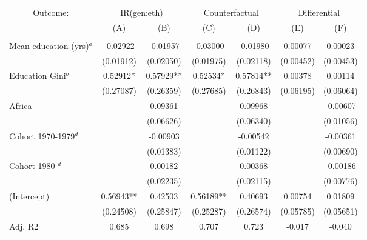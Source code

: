 
\begin{tabular}[t]{lcccccc}
\toprule
\multicolumn{1}{c}{Outcome:} & \multicolumn{2}{c}{IR(gen:eth)} & \multicolumn{2}{c}{Counterfactual} & \multicolumn{2}{c}{Differential} \\
\cmidrule(l{3pt}r{3pt}){1-1} \cmidrule(l{3pt}r{3pt}){2-3} \cmidrule(l{3pt}r{3pt}){4-5} \cmidrule(l{3pt}r{3pt}){6-7}
  & (A) & (B) & (C) & (D) & (E) & (F)\\
\midrule
\addlinespace[0.5em]
\multicolumn{7}{l}{\textit{Panel A: Education Variables}}\\
\midrule \hspace{1em}Mean education (yrs)$^a$ & -0.02922 & -0.01957 & -0.03000 & -0.01980 & 0.00077 & 0.00023\\
\hspace{1em} & (0.01912) & (0.02050) & (0.01975) & (0.02118) & (0.00452) & (0.00453)\\
\hspace{1em}Education Gini$^b$ & 0.52912* & 0.57929** & 0.52534* & 0.57814** & 0.00378 & 0.00114\\
\hspace{1em} & (0.27087) & (0.26359) & (0.27685) & (0.26843) & (0.06195) & (0.06064)\\
\hspace{1em}Africa &  & 0.09361 &  & 0.09968 &  & -0.00607\\
\hspace{1em} &  & (0.06626) &  & (0.06340) &  & (0.01056)\\
\hspace{1em}Cohort 1970-1979$^d$ &  & -0.00903 &  & -0.00542 &  & -0.00361\\
\hspace{1em} &  & (0.01383) &  & (0.01122) &  & (0.00690)\\
\hspace{1em}Cohort 1980-$^d$ &  & 0.00182 &  & 0.00368 &  & -0.00186\\
\hspace{1em} &  & (0.02235) &  & (0.02115) &  & (0.00776)\\
\hspace{1em}(Intercept) & 0.56943** & 0.42503 & 0.56189** & 0.40693 & 0.00754 & 0.01809\\
\hspace{1em} & (0.24508) & (0.25847) & (0.25287) & (0.26574) & (0.05785) & (0.05651)\\
\hspace{1em}Adj. R2 & 0.685 & 0.698 & 0.707 & 0.723 & -0.017 & -0.040\\

\end{tabular}
